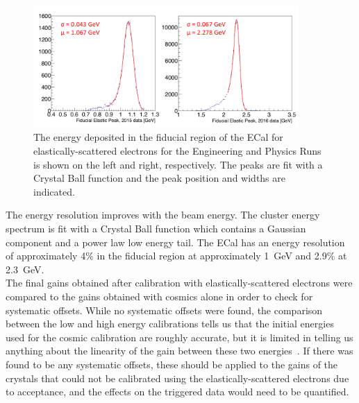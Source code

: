 \begin{figure}[htb]
  \centering
      \includegraphics[width=0.9\textwidth]{pics/performance/feePeakFid.png}
  \caption[Reconstructed elastic peak in the ECal for the Engineering and Physics Runs]{The energy deposited in the fiducial region of the ECal for elastically-scattered electrons for the Engineering and Physics Runs is shown on the left and right, respectively. The peaks are fit with a Crystal Ball function and the peak position and widths are indicated. }
  \label{Figure:FeeFidPeak}
\end{figure}

The energy resolution improves with the beam energy. The cluster energy spectrum is fit with a Crystal Ball function which contains a Gaussian component and a power law low energy tail. The ECal has an energy resolution of approximately 4$\%$ in the fiducial region at approximately 1~GeV and 2.9$\%$ at 2.3~GeV. \\
\indent The final gains obtained after calibration with elastically-scattered electrons were compared to the gains obtained with cosmics alone in order to check for systematic offsets. While no systematic offsets were found, the comparison between the low and high energy calibrations tells us that the initial energies used for the cosmic calibration are roughly accurate, but it is limited in telling us anything about the linearity of the gain between these two energies~\cite{szumila-vance_hps_2016}. If there was found to be any systematic offsets, these should be applied to the gains of the crystals that could not be calibrated using the elastically-scattered electrons due to acceptance, and the effects on the triggered data would need to be quantified. 

